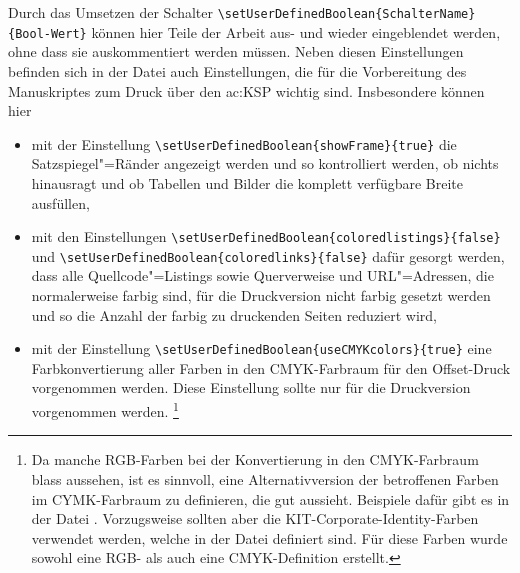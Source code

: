 Durch das Umsetzen der Schalter 
\lstinline|\setUserDefinedBoolean{SchalterName}{Bool-Wert}| 
können hier Teile der Arbeit aus- und wieder eingeblendet werden, ohne dass sie auskommentiert werden müssen.
Neben diesen Einstellungen befinden sich in der Datei  auch Einstellungen,
die für die Vorbereitung des Manuskriptes zum Druck über den \gls{ac:KSP} wichtig sind.
Insbesondere können hier

\begin{itemize} %

\item \justifying mit der Einstellung
\lstinline|\setUserDefinedBoolean{showFrame}{true}|
die Satzspiegel"=Ränder angezeigt werden und so kontrolliert werden,
ob nichts hinausragt und ob Tabellen und Bilder die komplett verfügbare Breite ausfüllen,

\item \justifying mit den Einstellungen
\lstinline|\setUserDefinedBoolean{coloredlistings}{false}| und 
\lstinline|\setUserDefinedBoolean{coloredlinks}{false}|
dafür gesorgt werden, dass alle Quellcode"=Listings sowie Querverweise und URL"=Adressen,
die normalerweise farbig sind, für die Druckversion nicht farbig gesetzt werden
und so die Anzahl der farbig zu druckenden Seiten reduziert wird,

\item \justifying mit der Einstellung
\lstinline|\setUserDefinedBoolean{useCMYKcolors}{true}|
eine Farbkonvertierung aller Farben in den CMYK-Farbraum für den Offset-Druck vorgenommen werden.
Diese Einstellung sollte nur für die Druckversion vorgenommen werden.%
\footnote{Da manche RGB-Farben bei der Konvertierung in den CMYK-Farbraum blass aussehen,
ist es sinnvoll, eine Alternativversion der betroffenen Farben im CYMK-Farbraum zu definieren,
die gut aussieht.
Beispiele dafür gibt es in der Datei .
Vorzugsweise sollten aber die KIT-Corporate-Identity-Farben verwendet werden,
welche in der Datei  definiert sind.
Für diese Farben wurde sowohl eine RGB- als auch eine CMYK-Definition erstellt.}

\end{itemize}

